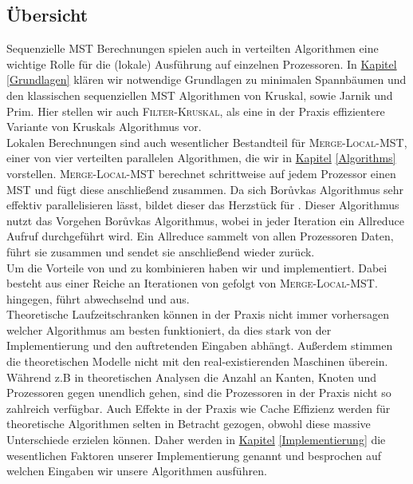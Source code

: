 \subsection{Übersicht}
Sequenzielle MST Berechnungen spielen auch in verteilten Algorithmen eine wichtige Rolle für die (lokale) Ausführung auf einzelnen Prozessoren. In \hyperref[Grundlagen]{Kapitel} \ref{Grundlagen} klären wir 
notwendige Grundlagen zu minimalen Spannbäumen und den klassischen sequenziellen MST Algorithmen von Kruskal, \boruvka sowie Jarnik und Prim. Hier stellen wir auch \textsc{Filter-Kruskal}, als eine in der Praxis effizientere Variante von Kruskals Algorithmus vor.\\
Lokalen Berechnungen sind auch wesentlicher Bestandteil für \textsc{Merge-Local-MST}, einer von vier verteilten parallelen Algorithmen, die wir in \hyperref[Algorithms]{Kapitel} \ref{Algorithms} vorstellen. \textsc{Merge-Local-MST} berechnet schrittweise auf jedem Prozessor einen MST und fügt diese anschließend zusammen. 
Da sich Bor{\r u}vkas Algorithmus sehr effektiv parallelisieren lässt, bildet dieser das Herzstück für \boruvkaAllreduceNoSpace.
Dieser Algorithmus nutzt das Vorgehen Bor{\r u}vkas Algorithmus, wobei in jeder Iteration ein Allreduce Aufruf durchgeführt wird. Ein Allreduce sammelt von allen Prozessoren Daten, führt sie zusammen und sendet sie anschließend wieder zurück.\\
Um die Vorteile von \boruvkaAllreduce und \mergeMST zu kombinieren haben wir \boruvkaThenMerge und \boruvkaMixedMerge implementiert. Dabei besteht \boruvkaThenMerge aus einer Reiche an Iterationen von \boruvkaAllreduce gefolgt von \textsc{Merge-Local-MST}. \boruvkaMixedMerge hingegen, führt abwechselnd \boruvkaAllreduce und \mergeMST aus.\\
Theoretische Laufzeitschranken können in der Praxis nicht immer vorhersagen welcher Algorithmus am besten funktioniert, da dies stark von der Implementierung und den  auftretenden Eingaben abhängt.
Außerdem stimmen die theoretischen Modelle nicht mit den real-existierenden Maschinen überein. Während z.B in theoretischen Analysen die Anzahl an Kanten, Knoten und Prozessoren gegen unendlich gehen, sind die Prozessoren in der Praxis nicht so zahlreich verfügbar. Auch Effekte in der Praxis wie Cache Effizienz werden für theoretische Algorithmen selten in Betracht gezogen, obwohl diese massive Unterschiede erzielen können.
Daher werden in \hyperref[Implementierung]{Kapitel} \ref{Implementierung} die wesentlichen Faktoren unserer Implementierung genannt und besprochen auf welchen Eingaben wir unsere Algorithmen ausführen.\\
